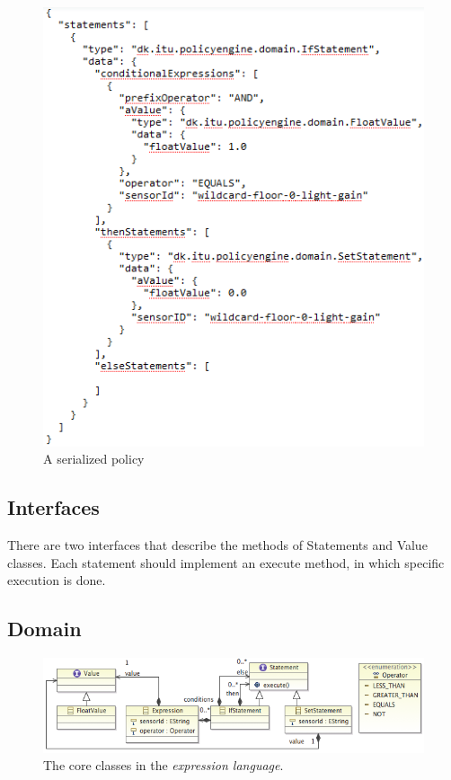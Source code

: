 \begin{figure}
	\centering
    \includegraphics[scale=0.85]{images/json_policy.png} 
	\caption{A serialized policy}
	\label{fig:json_policy}
\end{figure}

\subsection{Interfaces}
There are two interfaces that describe the methods of Statements and Value classes. Each statement should implement an execute method, in which specific execution is done. 
\subsection{Domain}
\label{s:Domain}
\begin{figure}
	\centering
    \includegraphics[scale=0.55]{chapters/implementation-model-expression-language.png} 
	\caption{The core classes in the \textit{expression language}.}
	\label{fig:ecore-sensors-actuators}
\end{figure}


